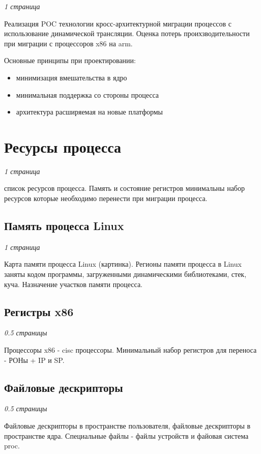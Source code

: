\textit{1 страница}

Реализация POC технологии кросс-архитектурной миграции процессов с использование динамической трансляции. Оценка потерь проихзводительности при миграции с процессоров x86 на arm.

Основные принципы при проектировании:

\begin{itemize}

\item минимизация вмешательства в ядро
\item минимальная поддержка со стороны процесса
\item архитектура расширяемая на новые платформы

\end{itemize}

\section{Ресурсы процесса}

\textit{1 страница}

список ресурсов процесса. Память и состояние регистров минимальны набор ресурсов которые необходимо перенести при миграции процесса.

\subsection{Память процесса Linux}

\textit{1 страница}

Карта памяти процесса Linux (картинка). Регионы памяти процесса в Linux заняты кодом программы, загруженными динамическими библиотеками, стек, куча. Назначение участков памяти процесса.

\subsection{Регистры x86}

\textit{0.5 страницы}

Процессоры x86 - cisc процессоры. Минимальный набор регистров для переноса - РОНы + IP и SP.

\subsection{Файловые дескрипторы}

\textit{0.5 страницы}

Файловые дескрипторы в пространстве пользователя, файловые дескрипторы в пространстве ядра. Специальные файлы - файлы устройств и файовая система proc.

